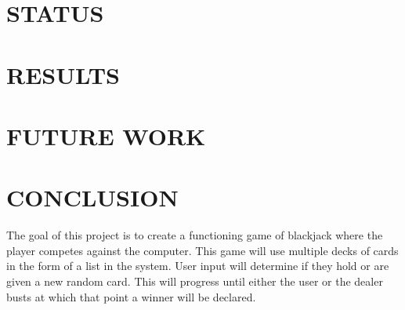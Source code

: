 \documentclass[12pt]{article}
\begin{document}




  
 

\section{STATUS}


\section{RESULTS}


\section{FUTURE WORK}


\section{CONCLUSION}

The goal of this project is to create a functioning game of blackjack where the player competes against the computer. This game will use multiple decks of cards in the form of a list in the system. User input will determine if they hold or are given a new random card. This will progress until either the user or the dealer busts at which that point a winner will be declared. 
\end{document}
